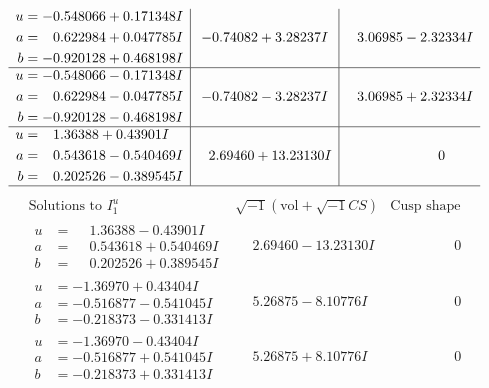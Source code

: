 \documentclass[1p]{elsarticle_modified}
\theoremstyle{definition}
\newcommand{\I}{\sqrt{-1}}
\begin{document}
$$\begin{array}{c|c|c}
\begin{aligned}
u &= -0.548066 + 0.171348 I \\
a &= \phantom{-}0.622984 + 0.047785 I \\
b &= -0.920128 + 0.468198 I\end{aligned}
 & -0.74082 + 3.28237 I & \phantom{-}3.06985 - 2.32334 I \\ \hline\begin{aligned}
u &= -0.548066 - 0.171348 I \\
a &= \phantom{-}0.622984 - 0.047785 I \\
b &= -0.920128 - 0.468198 I\end{aligned}
 & -0.74082 - 3.28237 I & \phantom{-}3.06985 + 2.32334 I \\ \hline\begin{aligned}
u &= \phantom{-}1.36388 + 0.43901 I \\
a &= \phantom{-}0.543618 - 0.540469 I \\
b &= \phantom{-}0.202526 - 0.389545 I\end{aligned}
 & \phantom{-}2.69460 + 13.23130 I & \phantom{-0.000000 } 0\\
 \hline 
 \end{array}$$\newpage$$\begin{array}{c|c|c}  
\text{Solutions to }I^u_{1}& \I (\text{vol} + \sqrt{-1}CS) & \text{Cusp shape}\\
 \hline 
\begin{aligned}
u &= \phantom{-}1.36388 - 0.43901 I \\
a &= \phantom{-}0.543618 + 0.540469 I \\
b &= \phantom{-}0.202526 + 0.389545 I\end{aligned}
 & \phantom{-}2.69460 - 13.23130 I & \phantom{-0.000000 } 0 \\ \hline\begin{aligned}
u &= -1.36970 + 0.43404 I \\
a &= -0.516877 - 0.541045 I \\
b &= -0.218373 - 0.331413 I\end{aligned}
 & \phantom{-}5.26875 - 8.10776 I & \phantom{-0.000000 } 0 \\ \hline\begin{aligned}
u &= -1.36970 - 0.43404 I \\
a &= -0.516877 + 0.541045 I \\
b &= -0.218373 + 0.331413 I\end{aligned}
 & \phantom{-}5.26875 + 8.10776 I & \phantom{-0.000000 } 0 \\ \hline\begin{aligned}

\end{aligned}
\end{array}$$
\end{document}
